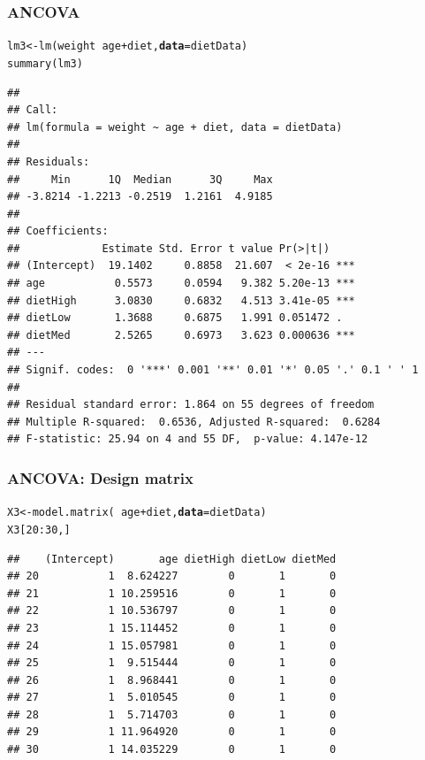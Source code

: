 \documentclass[color=usenames,dvipsnames]{beamer}\usepackage[]{graphicx}\usepackage[]{color}
\makeatletter
\newcommand{\hlnum}[1]{\textcolor[rgb]{0.69,0.494,0}{#1}}%
\newcommand{\hlopt}[1]{\textcolor[rgb]{0,0,0}{#1}}%
\newcommand{\hlstd}[1]{\textcolor[rgb]{0,0,0}{#1}}%
\newcommand{\hlkwb}[1]{\textcolor[rgb]{0,0.341,0.682}{#1}}%
\newcommand{\hlkwc}[1]{\textcolor[rgb]{0,0,0}{\textbf{#1}}}%
\newcommand{\hlkwd}[1]{\textcolor[rgb]{0.004,0.004,0.506}{#1}}%
\newenvironment{kframe}{%
 \def\at@end@of@kframe{}%
 \ifinner\ifhmode%
  \def\at@end@of@kframe{\end{minipage}}%
  \begin{minipage}{\columnwidth}%
 \fi\fi%
 \def\FrameCommand##1{\hskip\@totalleftmargin \hskip-\fboxsep
 \colorbox{shadecolor}{##1}\hskip-\fboxsep
     \hskip-\linewidth \hskip-\@totalleftmargin \hskip\columnwidth}%
 \MakeFramed {\advance\hsize-\width
   \@totalleftmargin\z@ \linewidth\hsize
   \@setminipage}}%
 {\par\unskip\endMakeFramed%
 \at@end@of@kframe}
\newenvironment{knitrout}{}{} %
\makeatother
\begin{document}
\begin{frame}[fragile]
  \frametitle{ANCOVA}
  \vspace{-2mm}
  \scriptsize %
\begin{knitrout}\scriptsize
{}\color{fgcolor}\begin{kframe}
\begin{alltt}
\hlstd{lm3} \hlkwb{<-} \hlkwd{lm}\hlstd{(weight} \hlopt{~} \hlstd{age} \hlopt{+} \hlstd{diet,} \hlkwc{data}\hlstd{=dietData)}
\hlkwd{summary}\hlstd{(lm3)}
\end{alltt}
\begin{verbatim}
## 
## Call:
## lm(formula = weight ~ age + diet, data = dietData)
## 
## Residuals:
##     Min      1Q  Median      3Q     Max 
## -3.8214 -1.2213 -0.2519  1.2161  4.9185 
## 
## Coefficients:
##             Estimate Std. Error t value Pr(>|t|)    
## (Intercept)  19.1402     0.8858  21.607  < 2e-16 ***
## age           0.5573     0.0594   9.382 5.20e-13 ***
## dietHigh      3.0830     0.6832   4.513 3.41e-05 ***
## dietLow       1.3688     0.6875   1.991 0.051472 .  
## dietMed       2.5265     0.6973   3.623 0.000636 ***
## ---
## Signif. codes:  0 '***' 0.001 '**' 0.01 '*' 0.05 '.' 0.1 ' ' 1
## 
## Residual standard error: 1.864 on 55 degrees of freedom
## Multiple R-squared:  0.6536,	Adjusted R-squared:  0.6284 
## F-statistic: 25.94 on 4 and 55 DF,  p-value: 4.147e-12
\end{verbatim}
\end{kframe}
\end{knitrout}
\end{frame}



\begin{frame}[fragile]
  \frametitle{ANCOVA: Design matrix}
\begin{knitrout}
\color{fgcolor}\begin{kframe}
\begin{alltt}
\hlstd{X3} \hlkwb{<-} \hlkwd{model.matrix}\hlstd{(}\hlopt{~}\hlstd{age}\hlopt{+}\hlstd{diet,} \hlkwc{data}\hlstd{=dietData)}
\hlstd{X3[}\hlnum{20}\hlopt{:}\hlnum{30}\hlstd{,]}
\end{alltt}
\begin{verbatim}
##    (Intercept)       age dietHigh dietLow dietMed
## 20           1  8.624227        0       1       0
## 21           1 10.259516        0       1       0
## 22           1 10.536797        0       1       0
## 23           1 15.114452        0       1       0
## 24           1 15.057981        0       1       0
## 25           1  9.515444        0       1       0
## 26           1  8.968441        0       1       0
## 27           1  5.010545        0       1       0
## 28           1  5.714703        0       1       0
## 29           1 11.964920        0       1       0
## 30           1 14.035229        0       1       0
\end{verbatim}
\end{kframe}
\end{knitrout}
\end{frame}
\end{document}
